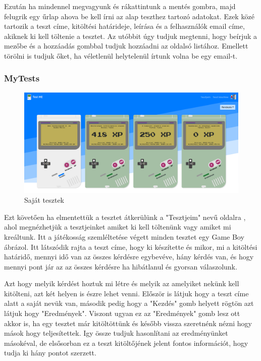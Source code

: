 Ezután ha mindennel megvagyunk és rákattintunk a mentés gombra, majd felugrik egy űrlap  ahova be kell írni az alap teszthez tartozó adatokat. Ezek közé tartozik a teszt címe, kitöltési határideje, leírása és a felhasználók email címe, akiknek ki kell töltenie a tesztet. Az utóbbit úgy tudjuk megtenni, hogy beírjuk a mezőbe és a hozzáadás gombbal tudjuk hozzáadni az oldalsó listához. Emellett törölni is tudjuk őket, ha véletlenül helytelenül írtunk volna be egy email-t.

\subsubsection{MyTests}


\begin{figure}[H]
    \centering
    \includegraphics[width=\linewidth]{images/my_tests.png}
    \caption{Saját tesztek}
    \label{fig:my_tests}
\end{figure}

Ezt követően ha elmentettük a tesztet átkerülünk a "Tesztjeim" nevű oldalra , ahol megnézhetjük a tesztjeinket amiket ki kell töltenünk vagy amiket mi kreáltunk. Itt a játékosság szemléltetése végett minden tesztet egy Game Boy ábrázol. Itt látszódik rajta a teszt címe, hogy ki készítette és mikor, mi a kitöltési határidő, mennyi idő van az összes kérdésre egybevéve, hány kérdés van, és hogy mennyi pont jár az az összes kérdésre ha hibátlanul és gyorsan válaszolunk. \newline

Azt hogy melyik kérdést hoztuk mi létre és melyik az amelyiket nekünk kell kitölteni, azt két helyen is észre lehet venni. Először is látjuk hogy a teszt címe alatt a saját nevük van, második pedig hogy a "Kezdés" gomb helyett rögtön azt látjuk hogy "Eredmények". Viszont ugyan ez az "Eredmények" gomb lesz ott akkor is, ha egy tesztet már kitöltöttünk és később vissza szeretnénk nézni hogy mások hogy teljesítettek. Igy össze tudjuk hasonlítani az eredményünket másokéval, de elsősorban ez a teszt kitöltőjének jelent fontos információt, hogy tudja ki hány pontot szerzett. \newline

